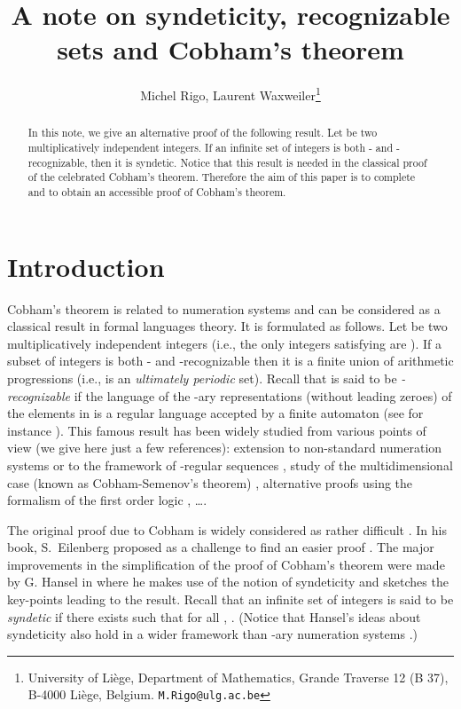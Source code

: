 \documentclass{beatcs}
\title{A note on syndeticity, recognizable sets and Cobham's theorem}
\author{Michel Rigo, Laurent Waxweiler\thanks{University of Li\`ege,
    Department of Mathematics, Grande Traverse 12 (B 37), B-4000
    Li\`ege, Belgium. \texttt{M.Rigo@ulg.ac.be}}}
\date{}
\begin{document}
\maketitle

\begin{abstract}
    In this note, we give an alternative proof of the following
    result.  Let  be two multiplicatively independent
    integers. If an infinite set of integers is both - and
    -recognizable, then it is syndetic. Notice that this result is
    needed in the classical proof of the celebrated Cobham's theorem.
    Therefore the aim of this paper is to complete \cite{Pe} and
    \cite{AS} to obtain an accessible proof of Cobham's theorem.
\end{abstract}

\section{Introduction}
Cobham's theorem is related to numeration systems and can be
considered as a classical result in formal languages theory. It is
formulated as follows. Let  be two multiplicatively
independent integers (i.e., the only integers satisfying 
are ).  If a subset  of integers is
both - and -recognizable then it is a finite union of arithmetic
progressions (i.e.,  is an {\it ultimately periodic} set). Recall
that  is said to be {\it -recognizable} if the
language  of the -ary representations (without leading
zeroes) of the elements in  is a regular language accepted by a
finite automaton (see for instance \cite[Chap. 5]{Ei}).  This famous
result has been widely studied from various points of view (we give
here just a few references): extension to non-standard numeration
systems \cite{Du,Ha} or to the framework of -regular sequences
\cite{bell}, study of the multidimensional case (known as
Cobham-Semenov's theorem) \cite{BHMV,PB}, alternative proofs using the
formalism of the first order logic \cite{Bes,MV}, \ldots.

The original proof due to Cobham is widely considered as rather
difficult \cite{Co}. In his book, S.~Eilenberg proposed as a challenge
to find an easier proof \cite{Ei}. The major improvements in the
simplification of the proof of Cobham's theorem were made by G. Hansel
in \cite{Ha1} where he makes use of the notion of syndeticity and
sketches the key-points leading to the result. Recall that an infinite
set of integers  is said to be {\it syndetic} if
there exists  such that for all , .
(Notice that Hansel's ideas about syndeticity also hold in a wider
framework than -ary numeration systems \cite{Ha2}.)
\end{document}
